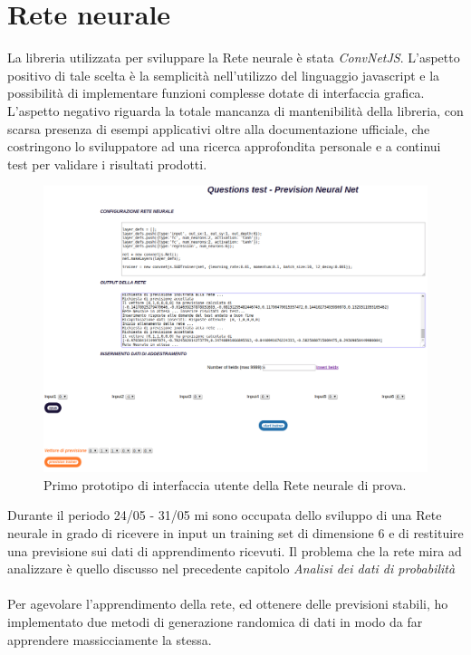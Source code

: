 \section{Rete neurale}
\label{Rete neurale}

La libreria utilizzata per sviluppare la Rete neurale \`e stata \textit{ConvNetJS}. L'aspetto positivo di tale scelta \`e  la semplicit\`a nell'utilizzo del linguaggio javascript e la possibilit\`a di implementare funzioni complesse dotate di interfaccia grafica. L'aspetto negativo riguarda la totale mancanza di mantenibilit\`a della libreria, con scarsa presenza di esempi applicativi oltre alla documentazione ufficiale, che costringono lo sviluppatore ad una ricerca approfondita personale e a continui test per validare i risultati prodotti.
\begin{figure}[H]
\centering
	\includegraphics[width=1\linewidth]{./image/GUI-rete-neurale.png}
	\caption{Primo prototipo di interfaccia utente della Rete neurale di prova.}
	\label{Prototipo interfaccia utente della Rete neurale di prova.}
\end{figure}
\noindent
Durante il periodo 24/05 - 31/05 mi sono occupata dello sviluppo di una Rete neurale in grado di ricevere in input un training set di dimensione 6 e di restituire una previsione sui dati di apprendimento ricevuti.
\noindent
Il problema che la rete mira ad analizzare \`e quello discusso nel precedente capitolo \textit{Analisi dei dati di probabilit\`a}
\\\\
Per agevolare l'apprendimento della rete, ed ottenere delle previsioni stabili, ho implementato due metodi di generazione randomica di dati in modo da far apprendere massicciamente la stessa.
